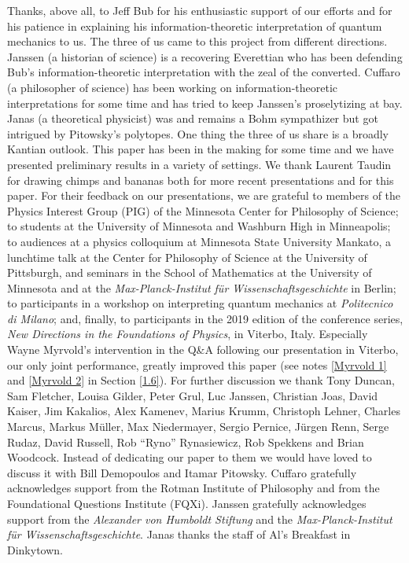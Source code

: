 \documentclass[12pt]{article}
\numberwithin{equation}{section}
\begin{document}
Thanks, above all, to Jeff Bub for his enthusiastic support of our efforts and for his patience in explaining his information-theoretic interpretation of quantum mechanics to us. The three of us came to this project from different directions. Janssen (a historian of science) is a recovering Everettian who has been defending Bub's information-theoretic interpretation with the zeal of the converted. Cuffaro (a philosopher of science) has been working on information-theoretic interpretations for some time and has tried to keep Janssen's proselytizing at bay. Janas (a theoretical physicist) was and remains a Bohm sympathizer but got intrigued by Pitowsky's polytopes. One thing the three of us share is a broadly Kantian outlook. This paper has been in the making for some time and we have presented preliminary results in a variety of settings. We thank Laurent Taudin for drawing chimps and bananas both for more recent presentations and for this paper. For their feedback on our presentations, we are grateful to members of the Physics Interest Group (PIG) of the Minnesota Center for Philosophy of Science; to students at the University of Minnesota and Washburn High in Minneapolis; to audiences at a physics colloquium at Minnesota State University Mankato, a lunchtime talk at the Center for Philosophy of Science at the University of Pittsburgh, and seminars in the School of Mathematics at the University of Minnesota and at the \emph{Max-Planck-Institut f\"ur Wissenschaftsgeschichte} in Berlin; to participants in a workshop on interpreting quantum mechanics at \emph{Politecnico di Milano}; and, finally, to participants in the 2019 edition of the conference series, \emph{New Directions in the Foundations of Physics}, in Viterbo, Italy. Especially Wayne Myrvold's intervention in the Q\&A following our presentation in Viterbo, our only joint performance, greatly improved this paper (see notes \ref{Myrvold 1} and \ref{Myrvold 2} in Section \ref{1.6}). For further discussion we thank Tony Duncan, Sam Fletcher, Louisa Gilder, Peter Grul, Luc Janssen, Christian Joas, David Kaiser, Jim Kakalios, Alex Kamenev, Marius Krumm, Christoph Lehner, Charles Marcus, Markus M\"uller, Max Niedermayer, Sergio Pernice, J\"urgen Renn, Serge Rudaz, David Russell, Rob ``Ryno'' Rynasiewicz, Rob Spekkens and Brian Woodcock.  Instead of dedicating our paper to them we would have loved to discuss it with Bill Demopoulos and Itamar Pitowsky. Cuffaro gratefully acknowledges support from the Rotman Institute of Philosophy and from the Foundational Questions Institute (FQXi). Janssen gratefully acknowledges support from the \emph{Alexander von Humboldt Stiftung} and the \emph{Max-Planck-Institut f\"ur Wissenschaftsgeschichte}. Janas thanks the staff of Al's Breakfast in Dinkytown.
\end{document}
